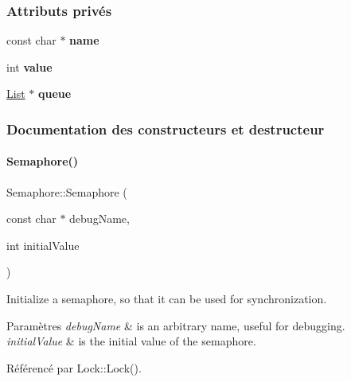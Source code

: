 \subsubsection*{Attributs privés}
\begin{DoxyCompactItemize}
\item 
\hypertarget{class_semaphore_a44d5bb3170dee133e805ab31e281acde}{}\label{class_semaphore_a44d5bb3170dee133e805ab31e281acde} 
const char $\ast$ {\bfseries name}
\item 
\hypertarget{class_semaphore_a951b9b5b03dd295a2cd1b193e03c03f6}{}\label{class_semaphore_a951b9b5b03dd295a2cd1b193e03c03f6} 
int {\bfseries value}
\item 
\hypertarget{class_semaphore_a42a688d9eb5fc88112988ce7d337326c}{}\label{class_semaphore_a42a688d9eb5fc88112988ce7d337326c} 
\hyperlink{class_list}{List} $\ast$ {\bfseries queue}
\end{DoxyCompactItemize}


\subsubsection{Documentation des constructeurs et destructeur}
\hypertarget{class_semaphore_a671a20336d97ab712cc84aab3381d34d}{}\label{class_semaphore_a671a20336d97ab712cc84aab3381d34d} 
\paragraph{\texorpdfstring{Semaphore()}{Semaphore()}}
{\footnotesize\ttfamily Semaphore\+::\+Semaphore (\begin{DoxyParamCaption}\item[{const char $\ast$}]{debug\+Name,  }\item[{int}]{initial\+Value }\end{DoxyParamCaption})}



Initialize a semaphore, so that it can be used for synchronization. 


\begin{DoxyParams}{Paramètres}
{\em debug\+Name} & is an arbitrary name, useful for debugging. \\
\hline
{\em initial\+Value} & is the initial value of the semaphore. \\
\hline
\end{DoxyParams}


Référencé par Lock\+::\+Lock().



